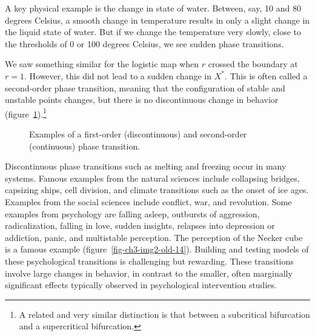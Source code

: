 \documentclass[
  a4paper,
  DIV=11,
  numbers=noendperiod,
  oneside]{scrreprt}
\begin{document}
A key physical example is the change in state of water. Between, say, 10
and 80 degrees Celsius, a smooth change in temperature results in only a
slight change in the liquid state of water. But if we change the
temperature very slowly, close to the thresholds of 0 or 100 degrees
Celsius, we see sudden phase transitions.

We saw something similar for the logistic map when \(r\) crossed the
boundary at \(r = 1\). However, this did not lead to a sudden change in
\(X^{*}\). This is often called a second-order phase transition, meaning
that the configuration of stable and unstable points changes, but there
is no discontinuous change in behavior
(figure~\ref{fig-ch3-img1-old-13}).\footnote{A related and very similar
  distinction is that between a subcritical bifurcation and a
  supercritical bifurcation.}

\begin{figure}


\caption{\label{fig-ch3-img1-old-13}Examples of a first-order
(discontinuous) and second-order (continuous) phase transition.}

\end{figure}%

Discontinuous phase transitions such as melting and freezing occur in
many systems. Famous examples from the natural sciences include
collapsing bridges, capsizing ships, cell division, and climate
transitions such as the onset of ice ages. Examples from the social
sciences include conflict, war, and revolution. Some examples from
psychology are falling asleep, outbursts of aggression, radicalization,
falling in love, sudden insights, relapses into depression or addiction,
panic, and multistable perception. The perception of the Necker cube is
a famous example (figure~\ref{fig-ch3-img2-old-14}). Building and
testing models of these psychological transitions is challenging but
rewarding. These transitions involve large changes in behavior, in
contrast to the smaller, often marginally significant effects typically
observed in psychological intervention studies.
\end{document}
